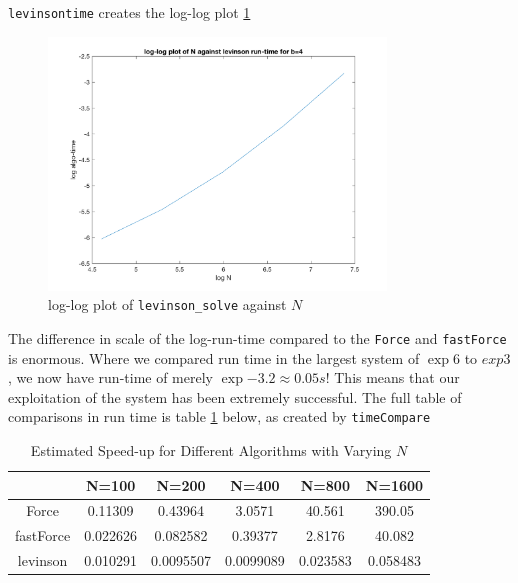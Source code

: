 \documentclass[paper=a4, fontsize=12pt]{scrartcl} %
\numberwithin{equation}{section}       %
\numberwithin{figure}{section}         %
\numberwithin{table}{section}          %
\begin{document}
\noindent \texttt{levinsontime} creates the log-log plot \ref{fig:Levplot}

\begin{figure}[h!]
  \centering
  \includegraphics[width=0.8\textwidth]{log-log_plot_levinson.png}
  \caption{log-log plot of \texttt{levinson\_solve} against $N$}
  \label{fig:Levplot}
\end{figure}

\noindent The difference in scale of the log-run-time compared to the \texttt{Force} and \texttt{fastForce} is enormous. Where we compared run time in the largest system of $\exp{6}$ to $exp{3}$, we now have run-time of merely $\exp{-3.2} \approx 0.05s$! This means that our exploitation of the system has been extremely successful. The full table of comparisons in run time is table \ref{table:2} below, as created by \texttt{timeCompare}


\begin{table}
\begin{center}
  \begin{tabular}{ c||c|c|c|c|c }
	    &  N=100  &     N=200   &     N=400    &   N=800     &  N=1600 \\
    \hline

    Force   &  0.11309   &   0.43964   &    3.0571   &   40.561    &  390.05 \\
    fastForce     & 0.022626   &  0.082582   &   0.39377   &   2.8176    &  40.082 \\
    levinson      & 0.010291   & 0.0095507  &  0.0099089   & 0.023583   & 0.058483 \\

  \end{tabular}
\end{center}
\caption{Estimated Speed-up for Different Algorithms with Varying $N$}
\label{table:2}
\end{table}
\end{document}

